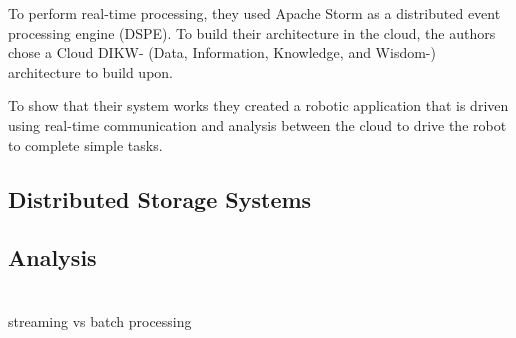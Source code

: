 To perform real-time processing, they used Apache Storm as a distributed event processing engine (DSPE). To build their architecture in the cloud, the authors chose a Cloud DIKW- (Data, Information, Knowledge, and Wisdom-) architecture to build upon. 

To show that their system works they created a robotic application that is driven using real-time communication and analysis between the cloud to drive the robot to complete simple tasks.


\subsection{Distributed Storage Systems}


\subsection{Analysis}


\section{}

streaming vs batch processing